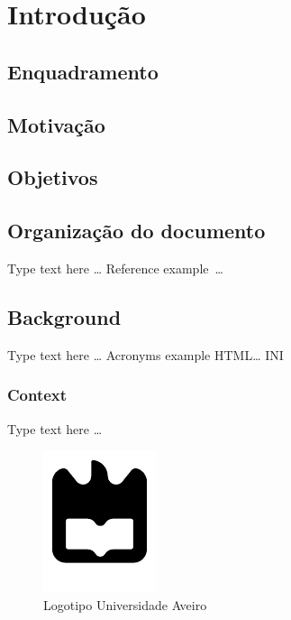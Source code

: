 \chapter{Introdução}




\section{Enquadramento}


\section{Motivação}


\section{Objetivos}


\section{Organização do documento}












Type text here \ldots
Reference example~\cite{Adams-1986a}\ldots

\section{Background} 
Type text here \ldots
Acronyms example \acs{HTML}\ldots
\acs{INI}

\newpage

\subsection{Context} 
Type text here \ldots


\begin{figure}[!htb]
\centering
\includegraphics{imgs/uaLogoNew.pdf}
\caption{Logotipo Universidade Aveiro}
\label{Rotulo}
\end{figure}

